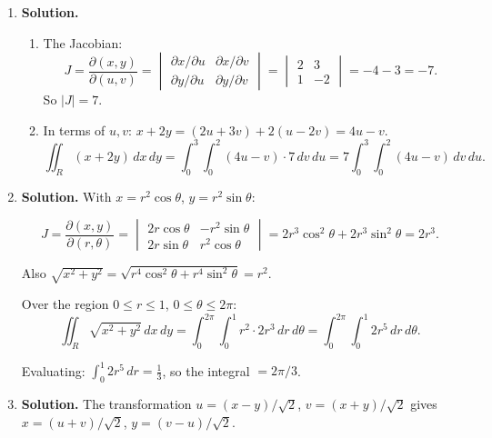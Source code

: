 \begin{enumerate}
The transformed integral is:
\[
\boxed{\int_0^2\int_0^2 \exp\!\left(\left(u + \frac{3v}{2}\right)^2\right)\,du\,dv, \quad |J| = 1}.
\]

(Note: while this doesn't fully separate the integrand, the region is now a rectangle, which is the primary simplification sought.)

\item \textbf{Solution.}
\begin{enumerate}
\item The Jacobian:
\[
J = \frac{\partial(x,y)}{\partial(u,v)} = \begin{vmatrix} \partial x/\partial u & \partial x/\partial v \\ \partial y/\partial u & \partial y/\partial v\end{vmatrix} = \begin{vmatrix} 2 & 3 \\ 1 & -2\end{vmatrix} = -4-3 = -7.
\]
So $|J| = \boxed{7}$.

\item In terms of $u,v$: $x+2y = (2u+3v)+2(u-2v) = 4u-v$.
\[
\boxed{\iint_R(x+2y)\,dx\,dy = \int_0^3\int_0^2(4u-v)\cdot 7\,dv\,du = 7\int_0^3\int_0^2(4u-v)\,dv\,du}.
\]
\end{enumerate}

\item \textbf{Solution.}
With $x = r^2\cos\theta$, $y = r^2\sin\theta$:

\[
J = \frac{\partial(x,y)}{\partial(r,\theta)} = \begin{vmatrix} 2r\cos\theta & -r^2\sin\theta \\ 2r\sin\theta & r^2\cos\theta\end{vmatrix} = 2r^3\cos^2\theta+2r^3\sin^2\theta = 2r^3.
\]

Also $\sqrt{x^2+y^2} = \sqrt{r^4\cos^2\theta+r^4\sin^2\theta} = r^2$.

Over the region $0\le r\le 1$, $0\le\theta\le 2\pi$:
\[
\boxed{\iint_R\sqrt{x^2+y^2}\,dx\,dy = \int_0^{2\pi}\int_0^1 r^2\cdot 2r^3\,dr\,d\theta = \int_0^{2\pi}\int_0^1 2r^5\,dr\,d\theta}.
\]

Evaluating: $\int_0^1 2r^5\,dr = \frac{1}{3}$, so the integral $= 2\pi/3$.

\item \textbf{Solution.}
The transformation $u = (x-y)/\sqrt{2}$, $v = (x+y)/\sqrt{2}$ gives $x = (u+v)/\sqrt{2}$, $y = (v-u)/\sqrt{2}$.


\end{enumerate}
